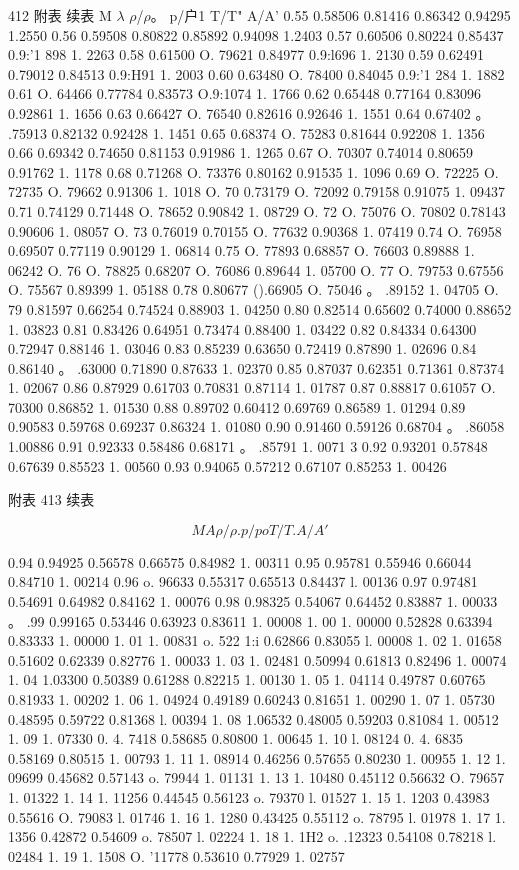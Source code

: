 412 附表 续表 M $\lambda$ $\rho$/$\rho$。 p/户1 T/T" A/A' 0.55 0.58506 0.81416 0.86342 0.94295 1.2550 0.56 0.59508 0.80822 0.85892 0.94098 1.2403 0.57 0.60506 0.80224 0.85437 0.9:'1 898 1. 2263 0.58 0.61500 O. 79621 0.84977 0.9:l696 1. 2130 0.59 0.62491 0.79012 0.84513 0.9:H91 1. 2003 0.60 0.63480 O. 78400 0.84045 0.9:'1 284 1. 1882 0.61 O. 64466 0.77784 0.83573 O.9:1074 1. 1766 0.62 0.65448 0.77164 0.83096 0.92861 1. 1656 0.63 0.66427 O. 76540 0.82616 0.92646 1. 1551 0.64 0.67402 。 .75913 0.82132 0.92428 1. 1451 0.65 0.68374 O. 75283 0.81644 0.92208 1. 1356 0.66 0.69342 0.74650 0.81153 0.91986 1. 1265 0.67 O. 70307 0.74014 0.80659 0.91762 1. 1178 0.68 0.71268 O. 73376 0.80162 0.91535 1. 1096 0.69 O. 72225 O. 72735 O. 79662 0.91306 1. 1018 O. 70 0.73179 O. 72092 0.79158 0.91075 1. 09437 0.71 0.74129 0.71448 O. 78652 0.90842 1. 08729 O. 72 O. 75076 O. 70802 0.78143 0.90606 1. 08057 O. 73 0.76019 0.70155 O. 77632 0.90368 1. 07419 0.74 O. 76958 0.69507 0.77119 0.90129 1. 06814 0.75 O. 77893 0.68857 O. 76603 0.89888 1. 06242 O. 76 O. 78825 0.68207 O. 76086 0.89644 1. 05700 O. 77 O. 79753 0.67556 O. 75567 0.89399 1. 05188 0.78 0.80677 ().66905 O. 75046 。 .89152 1. 04705 O. 79 0.81597 0.66254 0.74524 0.88903 1. 04250 0.80 0.82514 0.65602 0.74000 0.88652 1. 03823 0.81 0.83426 0.64951 0.73474 0.88400 1. 03422 0.82 0.84334 0.64300 0.72947 0.88146 1. 03046 0.83 0.85239 0.63650 0.72419 0.87890 1. 02696 0.84 0.86140 。 .63000 0.71890 0.87633 1. 02370 0.85 0.87037 0.62351 0.71361 0.87374 1. 02067 0.86 0.87929 0.61703 0.70831 0.87114 1. 01787 0.87 0.88817 0.61057 O. 70300 0.86852 1. 01530 0.88 0.89702 0.60412 0.69769 0.86589 1. 01294 0.89 0.90583 0.59768 0.69237 0.86324 1. 01080 0.90 0.91460 0.59126 0.68704 。 .86058 1.00886 0.91 0.92333 0.58486 0.68171 。 .85791 1. 0071 3 0.92 0.93201 0.57848 0.67639 0.85523 1. 00560 0.93 0.94065 0.57212 0.67107 0.85253 1. 00426

附表 413 续表

\[M A \rho /\rho .  p/po T/T. A/A '\]

0.94 0.94925 0.56578 0.66575 0.84982 1. 00311 0.95 0.95781 0.55946 0.66044 0.84710 1. 00214 0.96 o. 96633 0.55317 0.65513 0.84437 l. 00136 0.97 0.97481 0.54691 0.64982 0.84162 1. 00076 0.98 0.98325 0.54067 0.64452 0.83887 1. 00033 。 .99 0.99165 0.53446 0.63923 0.83611 1. 00008 1. 00 1. 00000 0.52828 0.63394 0.83333 1. 00000 1. 01 1. 00831 o. 522 1:i 0.62866 0.83055 l. 00008 1. 02 1. 01658 0.51602 0.62339 0.82776 1. 00033 1. 03 1. 02481 0.50994 0.61813 0.82496 1. 00074 1. 04 1.03300 0.50389 0.61288 0.82215 1. 00130 1. 05 1. 04114 0.49787 0.60765 0.81933 1. 00202 1. 06 1. 04924 0.49189 0.60243 0.81651 1. 00290 1. 07 1. 05730 0.48595 0.59722 0.81368 l. 00394 1. 08 1.06532 0.48005 0.59203 0.81084 1. 00512 1. 09 1. 07330 0. 4. 7418 0.58685 0.80800 1. 00645 1. 10 l. 08124 0. 4. 6835 0.58169 0.80515 1. 00793 1. 11 1. 08914 0.46256 0.57655 0.80230 1. 00955 1. 12 1. 09699 0.45682 0.57143 o. 79944 1. 01131 1. 13 1. 10480 0.45112 0.56632 O. 79657 1. 01322 1. 14 1. 11256 0.44545 0.56123 o. 79370 l. 01527 1. 15 1. 1203 0.43983 0.55616 O. 79083 l. 01746 1. 16 1. 1280 0.43425 0.55112 o. 78795 l. 01978 1. 17 1. 1356 0.42872 0.54609 o. 78507 l. 02224 1. 18 1. 1H2 o. .12323 0.54108 0.78218 l. 02484 1. 19 1. 1508 O. '11778 0.53610 0.77929 1. 02757

